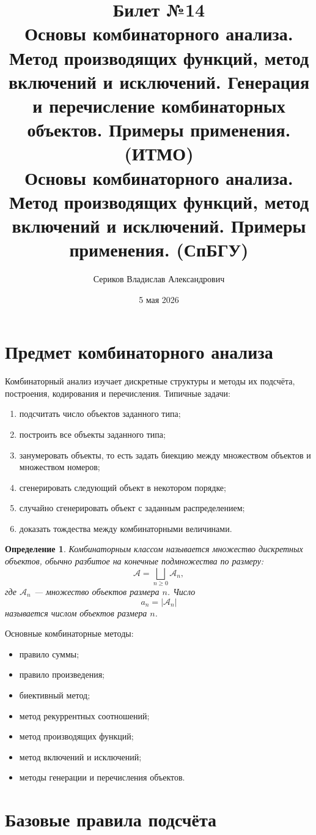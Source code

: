 \documentclass[12pt,a4paper]{article}
\title{Билет №14 \\ \small Основы комбинаторного анализа. Метод производящих функций, метод включений и исключений. Генерация и перечисление комбинаторных объектов. Примеры применения. (ИТМО) \\ Основы комбинаторного анализа. Метод производящих функций, метод включений и исключений. Примеры применения. (СпБГУ)}
\author{Сериков Владислав Александрович}
\date{5 мая 2026}
\newtheorem{definition}{Определение}
\begin{document}
\maketitle
\tableofcontents
\newpage

\section{Предмет комбинаторного анализа}

Комбинаторный анализ изучает дискретные структуры и методы их подсчёта, построения, кодирования и перечисления. Типичные задачи:
\begin{enumerate}
    \item подсчитать число объектов заданного типа;
    \item построить все объекты заданного типа;
    \item занумеровать объекты, то есть задать биекцию между множеством объектов и множеством номеров;
    \item сгенерировать следующий объект в некотором порядке;
    \item случайно сгенерировать объект с заданным распределением;
    \item доказать тождества между комбинаторными величинами.
\end{enumerate}

\begin{definition}
Комбинаторным классом называется множество дискретных объектов, обычно разбитое на конечные подмножества по размеру:
\[
\mathcal{A} = \bigsqcup_{n \ge 0} \mathcal{A}_n,
\]
где $\mathcal{A}_n$ --- множество объектов размера $n$.
Число
\[
a_n = |\mathcal{A}_n|
\]
называется числом объектов размера $n$.
\end{definition}

Основные комбинаторные методы:
\begin{itemize}
    \item правило суммы;
    \item правило произведения;
    \item биективный метод;
    \item метод рекуррентных соотношений;
    \item метод производящих функций;
    \item метод включений и исключений;
    \item методы генерации и перечисления объектов.
\end{itemize}

\section{Базовые правила подсчёта}
\end{document}
